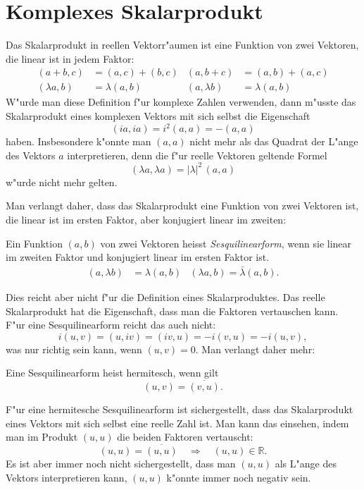 \section{Komplexes Skalarprodukt}
Das Skalarprodukt in reellen Vektorr"aumen ist eine Funktion von
zwei Vektoren, die linear ist in jedem Faktor:
\begin{align*}
(a+b,c)&=(a,c)+(b,c)&(a,b+c)&=(a,b)+(a,c)\\
(\lambda a,b)&=\lambda(a,b)&(a,\lambda b)&=\lambda(a,b)
\end{align*}
W"urde man diese Definition f"ur komplexe Zahlen verwenden, dann
m"usste das Skalarprodukt eines komplexen Vektors mit sich selbst
die Eigenschaft 
\[
(ia,ia)=i^2(a,a)=-(a,a)
\]
haben. Insbesondere k"onnte man $(a,a)$ nicht mehr als das Quadrat der
L"ange des Vektors $a$ interpretieren, denn die f"ur reelle Vektoren
geltende Formel
\[
(\lambda a,\lambda a)=|\lambda |^2\, (a,a)
\]
w"urde nicht mehr gelten.

Man verlangt daher, dass das Skalarprodukt eine Funktion von zwei Vektoren
ist, die linear ist im ersten Faktor, aber konjugiert linear im zweiten:
\begin{definition}
Ein Funktion $(a,b)$ von zwei Vektoren heisst {\em Sesquilinearform}, wenn
%
sie linear im zweiten Faktor und konjugiert linear im ersten Faktor ist.
\begin{align*}
(a,\lambda b)&=\lambda (a,b)&(\lambda a,b)=\bar\lambda (a,b).
\end{align*}
\end{definition}
Dies reicht aber nicht f"ur die Definition eines Skalarproduktes.
Das reelle Skalarprodukt hat die Eigenschaft, dass man die Faktoren
vertauschen kann. F"ur eine Sesquilinearform reicht das auch nicht:
\[
i(u,v)=(u,iv)=(iv,u)=-i(v,u)=-i(u,v),
\]
was nur richtig sein kann, wenn $(u,v)=0$. Man verlangt daher mehr:

\begin{definition}
Eine Sesquilinearform heist hermitesch, wenn gilt
\[
(u,v)=\overline{(v,u)}.
\]
\end{definition}
%
%
F"ur eine hermitesche Sesquilinearform ist sichergestellt, dass
das Skalarprodukt eines Vektors mit sich selbst eine reelle Zahl
ist. Man kann das einsehen, indem man im Produkt $(u,u)$ die beiden
Faktoren vertauscht:
\[
(u,u)=\overline{(u,u)}\quad\Rightarrow\quad (u,u)\in\mathbb R.
\]
Es ist aber immer noch nicht sichergestellt, dass man $(u,u)$ als
L"ange des Vektors interpretieren kann, $(u,u)$ k"onnte immer noch
negativ sein. 

